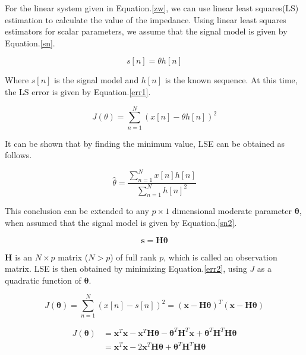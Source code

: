 \documentclass[9pt,a4paper,twoside]{rho-class/rho}
\begin{document}
For the linear system given in Equation.\eqref{zw}, we can use linear least squares(LS) estimation to calculate the value of the impedance. Using linear least squares estimators for scalar parameters, we assume that the signal model is given by Equation.\eqref{sn}.

\begin{equation}
    \label{sn}
    s[n]=\theta h[n]
\end{equation}

Where $s[n]$ is the signal model and $h[n]$ is the known sequence. At this time, the LS error is given by Equation.\eqref{err1}.

\begin{equation}
    \label{err1}
    J(\theta) = \sum^N_{n=1} (x[n] - \theta h[n])^2
\end{equation}

It can be shown that by finding the minimum value, LSE can be obtained as follows.

\begin{equation}
    \label{lse}
    \hat{\theta} = \dfrac{\sum^N_{n=1} x[n]h[n]}{\sum^N_{n=1} h[n]^2}
\end{equation}

This conclusion can be extended to any $p\times 1$ dimensional moderate parameter $\bm{\theta}$, when assumed that the signal model is given by Equation.\eqref{sn2}.

\begin{equation}
    \label{sn2}
    \bm{s}=\mathbf{H}\bm{\theta}
\end{equation}

$\mathbf{H}$ is an $N\times p$ matrix ($N>p$) of full rank $p$, which is called an observation matrix. LSE is then obtained by minimizing Equation.\eqref{err2}, using $J$ as a quadratic function of $\bm{\theta}$.

\begin{equation}
    \label{err2}
    J(\bm{\theta}) = \sum^N_{n=1} (x[n] - s[n])^2 =(\bm{x}-\mathbf{H}\bm{\theta})^T(\bm{x}-\mathbf{H}\bm{\theta})
\end{equation}

\begin{equation}
    \label{err3}
    \begin{aligned}
        J(\bm{\theta}) &= \bm{x}^T\bm{x}-\bm{x}^T\mathbf{H}\bm{\theta}-\bm{\theta}^T\mathbf{H}^T\bm{x}+\bm{\theta}^T\mathbf{H}^T\mathbf{H}\bm{\theta}\\
        &= \bm{x}^T\bm{x}-2\bm{x}^T\mathbf{H}\bm{\theta}+\bm{\theta}^T\mathbf{H}^T\mathbf{H}\bm{\theta}
    \end{aligned}
\end{equation}
\end{document}
